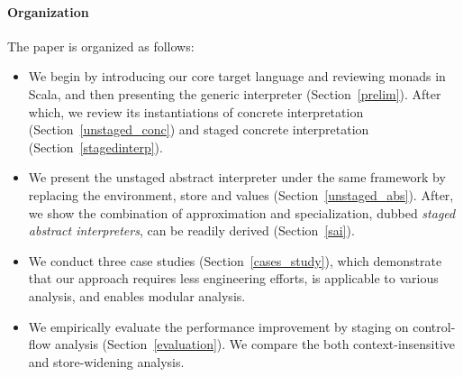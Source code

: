 \paragraph{Organization} The paper is organized as follows:
\begin{itemize}[leftmargin=2em]
  \item We begin by introducing our core target language and reviewing
    monads in Scala, and then presenting the generic interpreter (Section~\ref{prelim}).
    After which, we review its instantiations of concrete interpretation
    (Section~\ref{unstaged_conc}) and staged concrete interpretation
    (Section~\ref{stagedinterp}).
  \item We present the unstaged abstract interpreter under the same framework by
    replacing the environment, store and values (Section~\ref{unstaged_abs}).
    After, we show the combination of approximation and specialization, dubbed
    \textit{staged abstract interpreters}, can be readily derived (Section~\ref{sai}).
  \item We conduct three case studies (Section~\ref{cases_study}), which demonstrate that
    our approach requires less engineering efforts, is applicable to various analysis,
    and enables modular analysis.
  \item We empirically evaluate the performance improvement by staging on
    control-flow analysis (Section~\ref{evaluation}). We compare the both
    context-insensitive and store-widening analysis.
\end{itemize}

\iffalse
On the other side, static analysis is a tradeoff between performance and
precision: higher precision usually leads to longer running time.

4. Existing method to improve the performance is adhoc, engineering heavy, require to rewrite the optimized version, therefore harder to reason about the correctness
6. program analyzers are also meta-programs, they manipulate other programs as data objects
\fi
